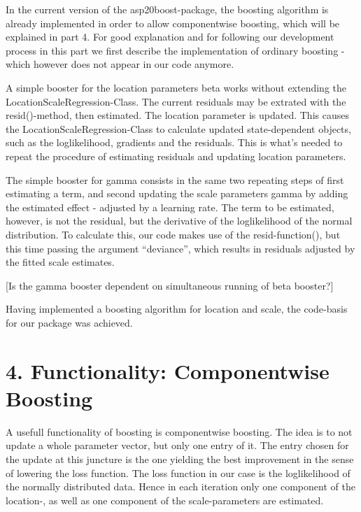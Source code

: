 \documentclass[
]{report}
\begin{document}
In the current version of the asp20boost-package, the boosting algorithm
is already implemented in order to allow componentwise boosting, which
will be explained in part 4. For good explanation and for following our
development process in this part we first describe the implementation of
ordinary boosting - which however does not appear in our code anymore.

A simple booster for the location parameters beta works without
extending the LocationScaleRegression-Class. The current residuals may
be extrated with the resid()-method, then estimated. The location
parameter is updated. This causes the LocationScaleRegression-Class to
calculate updated state-dependent objects, such as the loglikelihood,
gradients and the residuals. This is what's needed to repeat the
procedure of estimating residuals and updating location parameters.

The simple booster for gamma consists in the same two repeating steps of
first estimating a term, and second updating the scale parameters gamma
by adding the estimated effect - adjusted by a learning rate. The term
to be estimated, however, is not the residual, but the derivative of the
loglikelihood of the normal distribution. To calculate this, our code
makes use of the resid-function(), but this time passing the argument
``deviance'', which results in residuals adjusted by the fitted scale
estimates.

{[}Is the gamma booster dependent on simultaneous running of beta
booster?{]}

Having implemented a boosting algorithm for location and scale, the
code-basis for our package was achieved.

\hypertarget{functionality-componentwise-boosting}{%
\chapter{4. Functionality: Componentwise
Boosting}\label{functionality-componentwise-boosting}}

A usefull functionality of boosting is componentwise boosting. The idea
is to not update a whole parameter vector, but only one entry of it. The
entry chosen for the update at this juncture is the one yielding the
best improvement in the sense of lowering the loss function. The loss
function in our case is the loglikelihood of the normally distributed
data. Hence in each iteration only one component of the location-, as
well as one component of the scale-parameters are estimated.
\end{document}
